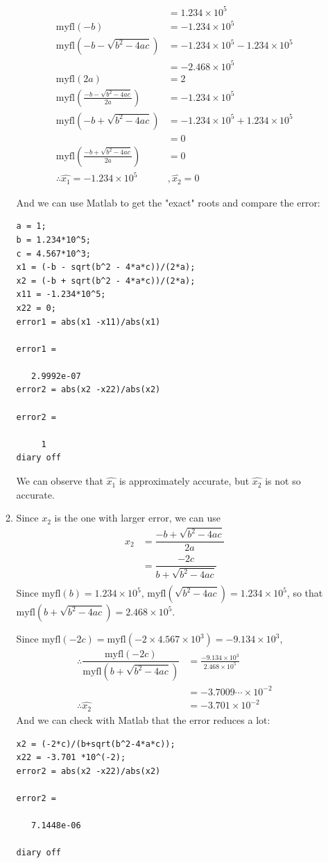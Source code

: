 \documentclass{article}
\begin{document}
\begin{enumerate}
\begin{enumerate}
\begin{align*}
&=1.234 \times 10^5\\
\mbox{myfl}(-b )&= -1.234 \times 10^5\\
\mbox{myfl}(-b-\sqrt{b^2-4ac})&=  -1.234 \times 10^5 -1.234 \times 10^5\\&=-2.468 \times 10^5\\
\mbox{myfl}(2a ) &=2\\
\mbox{myfl}\left(\frac{-b-\sqrt{b^2-4ac}}{2a}\right)&=  -1.234 \times 10^5\\
\mbox{myfl}(-b+\sqrt{b^2-4ac})&=  -1.234 \times 10^5 +1.234 \times 10^5\\&=0\\
\mbox{myfl}\left(\frac{-b+\sqrt{b^2-4ac}}{2a}\right)&=  0\\
\therefore \hat{x_1} = -1.234 \times 10^5&,\hat{x_2} =0
\end{align*}

And we can use Matlab to get the "exact" roots and compare the error:
\begin{lstlisting}
a = 1;
b = 1.234*10^5;
c = 4.567*10^3;
x1 = (-b - sqrt(b^2 - 4*a*c))/(2*a);
x2 = (-b + sqrt(b^2 - 4*a*c))/(2*a);
x11 = -1.234*10^5;
x22 = 0;
error1 = abs(x1 -x11)/abs(x1)

error1 =

   2.9992e-07
error2 = abs(x2 -x22)/abs(x2)

error2 =

     1
diary off
\end{lstlisting}
We can observe that $\hat{x_1}$ is approximately accurate, but $\hat{x_2}$ is not so accurate.

\item
Since $\hat{x_2}$ is the one with larger error, we can use \begin{align*}
x_2 &=\dfrac{-b+\sqrt{b^2 - 4ac}}{2a}\\
&=\dfrac{-2c}{b+\sqrt{b^2-4ac}}\\
\end{align*}
Since $\mbox{myfl}(b) = 1.234\times 10^5$,  $\mbox{myfl}(\sqrt{b^2-4ac}) = 1.234\times 10^5$, so that $\mbox{myfl}(b+\sqrt{b^2-4ac}) = 2.468\times 10^5$.

Since $\mbox{myfl}(-2c) = \mbox{myfl}(-2\times 4.567\times 10^3) = -9.134\times 10^3$,
\begin{align*}
\therefore \dfrac{\mbox{myfl}(-2c)}{\mbox{myfl}(b+\sqrt{b^2-4ac})}&=\frac{-9.134\times 10^3}{2.468\times 10^5}\\
&=-3.7009\cdots \times 10^{-2}\\
\therefore \hat{x_2}&=-3.701\times 10^{-2}
\end{align*}
And we can check with Matlab that the error reduces a lot:

\begin{lstlisting}
x2 = (-2*c)/(b+sqrt(b^2-4*a*c));
x22 = -3.701 *10^(-2);
error2 = abs(x2 -x22)/abs(x2)

error2 =

   7.1448e-06

diary off

\end{lstlisting}
\end{enumerate}
\end{enumerate}
\end{document}
